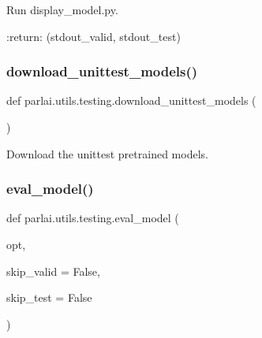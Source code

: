 \begin{DoxyVerb}Run display_model.py.

:return: (stdout_valid, stdout_test)
\end{DoxyVerb}
 \mbox{\label{namespaceparlai_1_1utils_1_1testing_ae0c93fc8f4c3e079333dba0065fa4dd2}} 
\subsubsection{\texorpdfstring{download\+\_\+unittest\+\_\+models()}{download\_unittest\_models()}}
{\footnotesize\ttfamily def parlai.\+utils.\+testing.\+download\+\_\+unittest\+\_\+models (\begin{DoxyParamCaption}{ }\end{DoxyParamCaption})}

\begin{DoxyVerb}Download the unittest pretrained models.
\end{DoxyVerb}
 \mbox{\label{namespaceparlai_1_1utils_1_1testing_a6fb595d4398ee27f4d183911419a222a}} 
\subsubsection{\texorpdfstring{eval\+\_\+model()}{eval\_model()}}
{\footnotesize\ttfamily def parlai.\+utils.\+testing.\+eval\+\_\+model (\begin{DoxyParamCaption}\item[{}]{opt,  }\item[{}]{skip\+\_\+valid = {\ttfamily False},  }\item[{}]{skip\+\_\+test = {\ttfamily False} }\end{DoxyParamCaption})}

